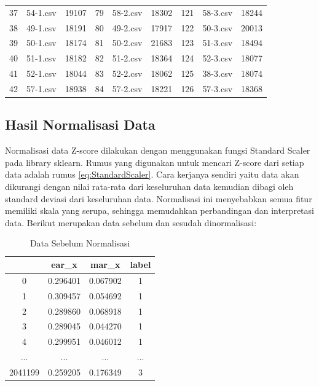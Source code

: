 \begin{longtable}{|c|c|c|c|c|c|c|c|c|}
  37          & 54-1.csv       & 19107         & 79          & 58-2.csv       & 18302         & 121         & 58-3.csv       & 18244         \\
  38          & 49-1.csv       & 18191         & 80          & 49-2.csv       & 17917         & 122         & 50-3.csv       & 20013         \\
  39          & 50-1.csv       & 18174         & 81          & 50-2.csv       & 21683         & 123         & 51-3.csv       & 18494         \\
  40          & 51-1.csv       & 18182         & 82          & 51-2.csv       & 18364         & 124         & 52-3.csv       & 18077         \\
  41          & 52-1.csv       & 18044         & 83          & 52-2.csv       & 18062         & 125         & 38-3.csv       & 18074         \\
  42          & 57-1.csv       & 18938         & 84          & 57-2.csv       & 18221         & 126         & 57-3.csv       & 18368         \\
  \hline
\end{longtable}

\subsection{Hasil Normalisasi Data}
Normalisasi data Z-score dilakukan dengan menggunakan fungsi Standard Scaler pada library sklearn. Rumus yang digunakan untuk mencari
Z-score dari setiap data adalah rumus \ref{eq:StandardScaler}. Cara kerjanya sendiri yaitu data akan dikurangi dengan nilai rata-rata
dari keseluruhan data kemudian dibagi oleh standard deviasi dari keseluruhan data. Normalisasi ini menyebabkan semua fitur
memiliki skala yang serupa, sehingga memudahkan perbandingan dan interpretasi data. Berikut merupakan data sebelum dan sesudah
dinormalisasi:

\begin{longtable}{|c|c|c|c|}
  \caption{Data Sebelum Normalisasi}
  \label{tb:NaNdata}                                             \\
  \hline
  \rowcolor[HTML]{C0C0C0}
  \textbf{} & \textbf{ear\_x} & \textbf{mar\_x} & \textbf{label} \\
  \hline
  0         & 0.296401        & 0.067902        & 1              \\
  1         & 0.309457        & 0.054692        & 1              \\
  2         & 0.289860        & 0.068918        & 1              \\
  3         & 0.289045        & 0.044270        & 1              \\
  4         & 0.299951        & 0.046012        & 1              \\
  ...       & ...             & ...             & ...            \\
  2041199   & 0.259205        & 0.176349        & 3              \\
  \hline
\end{longtable}

